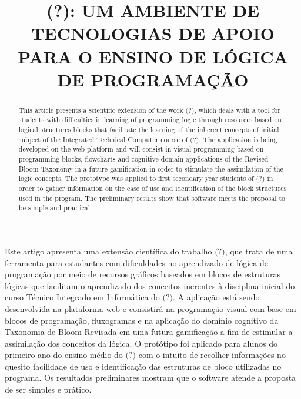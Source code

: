 \documentclass[12pt]{article}
\title{(?): UM AMBIENTE DE TECNOLOGIAS DE APOIO PARA O ENSINO DE LÓGICA DE PROGRAMAÇÃO}
\author{}
\begin{document}
 

\maketitle

\begin{abstract}
This article presents a scientific extension of the work $\textit{(?)}$, which deals with a tool for students with 
difficulties in learning of programming logic through resources based on logical structures blocks that facilitate the learning of the inherent concepts of initial subject of the Integrated Technical Computer course of $\textit{(?)}$. The application is being developed on the web platform and will consist in visual programming based on programming blocks, flowcharts and cognitive domain applications of the Revised Bloom Taxonomy in a future gamification in order to stimulate the assimilation of the logic concepts. The prototype was applied to first secondary year students of $\textit{(?)}$ in order to gather information on the ease of use and identification of the block structures used in the program. The preliminary results show that software meets the proposal to be simple and practical.
\end{abstract}
     
\begin{resumo}
Este artigo apresenta uma extensão científica do trabalho $\textit{(?)}$, que trata de uma ferramenta para estudantes com dificuldades no aprendizado de lógica de programação por meio de recursos gráficos baseados em blocos de estruturas lógicas que facilitam o aprendizado dos conceitos inerentes à disciplina inicial do curso Técnico Integrado em Informática do $\textit{(?)}$. A aplicação está sendo desenvolvida na plataforma web e consistirá na programação visual com base em blocos de programação, fluxogramas e na aplicação do domínio cognitivo da Taxonomia de Bloom Revisada em uma futura gamificação a fim de estimular a assimilação dos conceitos da lógica.  O protótipo foi aplicado para alunos do primeiro ano do ensino médio do $\textit{(?)}$ com o intuito de recolher informações no quesito facilidade de uso e identificação das estruturas de bloco utilizadas no programa. Os resultados preliminares mostram que o software atende a proposta de ser simples e prático.  
\end{resumo}
\end{document}
